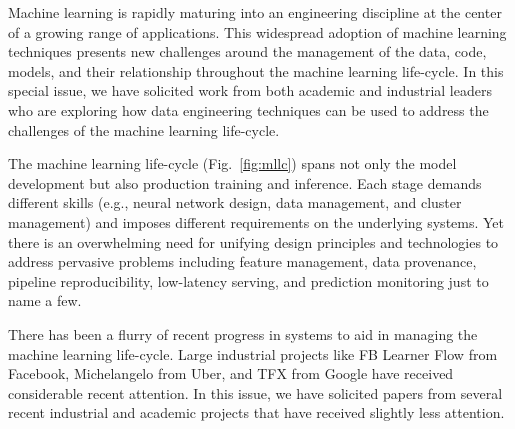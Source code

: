\documentclass[11pt]{article}
\begin{document}
Machine learning is rapidly maturing into an engineering discipline at the center of a growing range of applications.
This widespread adoption of machine learning techniques presents new challenges around the management of the data, code, models, and their relationship throughout the machine learning life-cycle.
In this special issue, 
we have solicited work from both academic and industrial leaders 
who are exploring how data engineering techniques can be used to address the challenges of the machine learning life-cycle.



\iffalse
\begin{figure}[h]
\centering
\texttt{[image: letters/pipeline.pdf]}
\caption{\small \textbf{Machine Learning Life-cycle.} A simplified depiction of the key stages of a machine learning application.}
\label{fig:mllc}
\end{figure}
\fi


The machine learning life-cycle (Fig.~\ref{fig:mllc}) spans not only the model development but also production training and inference.
Each stage demands different skills (e.g., neural network design, data management, and cluster management) and imposes different requirements on the underlying systems.
Yet there is an overwhelming need for unifying design principles and technologies to address pervasive problems including feature management, data provenance, pipeline reproducibility, low-latency serving, and prediction monitoring just to name a few.


There has been a flurry of recent progress in systems to aid in managing the machine learning life-cycle.  
Large industrial projects like 
FB Learner Flow 
from Facebook, 
Michelangelo 
from Uber, and 
TFX 
from Google have received considerable recent attention.  
In this issue, we have solicited papers from several recent industrial and academic projects that have received slightly less attention.
\end{document}
